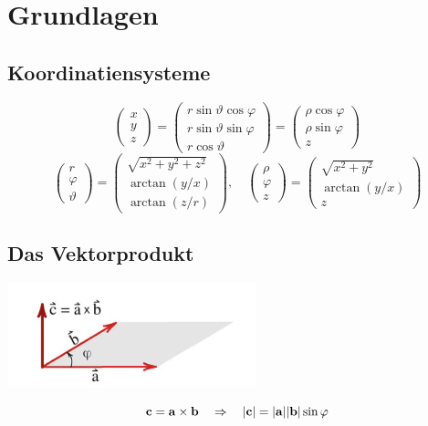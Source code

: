 \section{Grundlagen}
\subsection{Koordinatiensysteme}
\begin{equation}
\begin{pmatrix} x \\ y \\ z\end{pmatrix} = 
\begin{pmatrix}r \sin\vartheta \cos\varphi \\ r \sin\vartheta \sin\varphi \\ r \cos\vartheta \end{pmatrix} =
\begin{pmatrix}\rho \cos\varphi \\ \rho \sin\varphi \\ z \end{pmatrix}
\end{equation}
\begin{equation}
\begin{pmatrix} r \\ \varphi \\ \vartheta \end{pmatrix} =
\begin{pmatrix} \sqrt{x^2 + y^2 + z^2}  \\ \arctan\left(y/x\right) \\ \arctan\left(z/r\right) \end{pmatrix}
,\quad
\begin{pmatrix} \rho \\ \varphi \\ z \end{pmatrix} =
\begin{pmatrix} \sqrt{x^2 + y^2} \\ \arctan\left(y/x\right) \\ z \end{pmatrix}
\end{equation}

\subsection{Das Vektorprodukt}
\begin{center}
\includegraphics[scale=0.4]{./images/VectorProduct.png}
\end{center}
\begin{equation}
\mathbf{c} = \mathbf{a} \times \mathbf{b} \quad\Rightarrow\quad \mathbf{\left| c \right|} = \mathbf{\left| a \right|}\mathbf{\left| b \right|}\sin\varphi
\end{equation}


